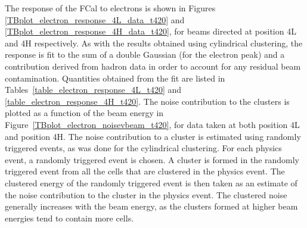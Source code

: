 The response of the FCal to electrons is shown in Figures \ref{TBplot_electron_response_4L_data_t420} and \ref{TBplot_electron_response_4H_data_t420}, for beams directed at position 4L and 4H respectively. As with the results obtained using cylindrical clustering, the response is fit to the sum of a double Gaussian (for the electron peak) and a contribution derived from hadron data in order to account for any residual beam contamination. Quantities obtained from the fit are listed in Tables~\ref{table_electron_response_4L_t420} and \ref{table_electron_response_4H_t420}. The noise contribution to the clusters is plotted as a function of the beam energy in Figure~\ref{TBplot_electron_noisevbeam_t420}, for data taken at both position 4L and position 4H. The noise contribution to a cluster is estimated using randomly triggered events, as was done for the cylindrical clustering. For each physics event, a randomly triggered event is chosen. A cluster is formed in the randomly triggered event from all the cells that are clustered in the physics event. The clustered energy of the randomly triggered event is then taken as an estimate of the noise contribution to the cluster in the physics event. The clustered noise generally increases with the beam energy, as the clusters formed at higher beam energies tend to contain more cells.
%




